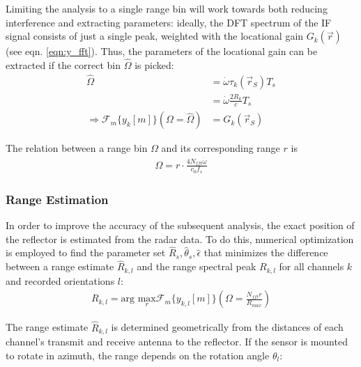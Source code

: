 Limiting the analysis to a single range bin will work towards both reducing interference and extracting parameters:
ideally, the DFT spectrum of the IF signal consists of just a single peak,
weighted with the locational gain $G_k(\vec r)$ (see eqn. \ref{eqn:y_fft}).
Thus, the parameters of the locational gain can be extracted if the correct bin $\hat \Omega$ is picked:
\begin{align}
    \hat \Omega                                               & = \dot \omega \tau_k(\vec r_S)T_s    \\
                                                              & = \dot \omega \frac{2R_k}{c}T_s      \\
    \Rightarrow \mathcal{F}_m\{y_k[m]\}(\Omega = \hat \Omega) & =    G_k(\vec r_S) \label{eqn:G_fft}
\end{align}

The relation between a range bin $\Omega$ and its corresponding range $r$ is
\begin{align}
    \Omega = r \cdot \frac{4N_{fft}\dot\omega}{c_0f_s}
\end{align}

\subsubsection*{Range Estimation}

In order to improve the accuracy of the subsequent analysis, the exact position of the reflector is estimated from the radar data.
To do this, numerical optimization is employed to find the parameter set $\hat R_s, \hat \theta_s, \hat \epsilon$ that minimizes the difference between
a range estimate $\hat R_{k,l}$ and the range spectral peak $R_{k,l}$ for all channels $k$ and recorded orientations $l$:
\begin{align}
    R_{k,l} = \text{arg } \underset{r}{\text{max}}\mathcal{F}_m\{y_{k,l}[m]\}\left(\Omega = \frac{N_{fft}r}{R_{max}}\right)
\end{align}

The range estimate $\hat R_{k,l}$ is determined geometrically from the distances of each channel's
transmit and receive antenna to the reflector. If the sensor is mounted to rotate in azimuth,
the range depends on the rotation angle $\theta_l $:

